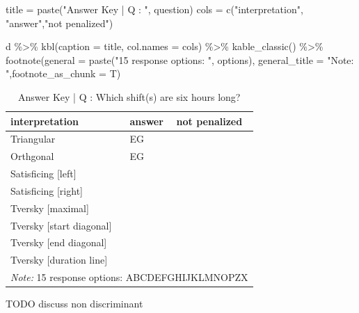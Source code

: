 \documentclass[
  letterpaper,
  DIV=11,
  numbers=noendperiod]{scrreprt}
\newenvironment{Shaded}{\begin{snugshade}}{\end{snugshade}}
\newcommand{\AttributeTok}[1]{\textcolor[rgb]{0.40,0.45,0.13}{#1}}
\newcommand{\FunctionTok}[1]{\textcolor[rgb]{0.28,0.35,0.67}{#1}}
\newcommand{\NormalTok}[1]{\textcolor[rgb]{0.00,0.23,0.31}{#1}}
\newcommand{\OtherTok}[1]{\textcolor[rgb]{0.00,0.23,0.31}{#1}}
\newcommand{\SpecialCharTok}[1]{\textcolor[rgb]{0.37,0.37,0.37}{#1}}
\newcommand{\StringTok}[1]{\textcolor[rgb]{0.13,0.47,0.30}{#1}}
\begin{document}
\begin{Shaded}
\begin{Highlighting}[]
\NormalTok{title }\OtherTok{=} \FunctionTok{paste}\NormalTok{(}\StringTok{"Answer Key | Q : "}\NormalTok{, question)}
\NormalTok{cols }\OtherTok{=} \FunctionTok{c}\NormalTok{(}\StringTok{"interpretation"}\NormalTok{, }\StringTok{"answer"}\NormalTok{,}\StringTok{"not penalized"}\NormalTok{)}

\NormalTok{d }\SpecialCharTok{\%\textgreater{}\%} \FunctionTok{kbl}\NormalTok{(}\AttributeTok{caption =}\NormalTok{ title, }\AttributeTok{col.names =}\NormalTok{ cols) }\SpecialCharTok{\%\textgreater{}\%} \FunctionTok{kable\_classic}\NormalTok{() }\SpecialCharTok{\%\textgreater{}\%}
  \FunctionTok{footnote}\NormalTok{(}\AttributeTok{general =} \FunctionTok{paste}\NormalTok{(}\StringTok{"15 response options: "}\NormalTok{, options), }\AttributeTok{general\_title =} \StringTok{"Note: "}\NormalTok{,}\AttributeTok{footnote\_as\_chunk =}\NormalTok{ T)}
\end{Highlighting}
\end{Shaded}

\begin{table}

\caption{Answer Key | Q :  Which shift(s) are six hours long?}
\centering
\begin{tabular}[t]{l|l|l}
\hline
interpretation & answer & not penalized\\
\hline
Triangular & EG & \\
\hline
Orthgonal & EG & \\
\hline
Satisficing [left] &  & \\
\hline
Satisficing [right] &  & \\
\hline
Tversky [maximal] &  & \\
\hline
Tversky [start diagonal] &  & \\
\hline
Tversky [end diagonal] &  & \\
\hline
Tversky [duration line] &  & \\
\hline
\multicolumn{3}{l}{\rule{0pt}{1em}\textit{Note: } 15 response options:  ABCDEFGHIJKLMNOPZX}\\
\end{tabular}
\end{table}

TODO discuss non discriminant
\end{document}
